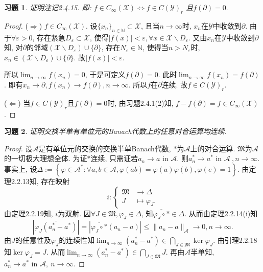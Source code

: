 \documentclass[UTF8,twoside]{ctexbook}
\newtheorem{exercise}{习题}[section]
\newcommand{\h}{\mathscr}
\newcommand{\kx}{\mathbb}
\numberwithin{equation}{section}
\begin{document}
	\begin{exercise}
		证明注记2.4.15. 即: $f\in C_\infty(\h X)\Longleftrightarrow f\in C(\h Y)_r$ 且$f(\partial)=0.$
	\end{exercise}
	\begin{proof}
		($\Rightarrow$) $f\in C_\infty(\h X)$. 设$\{x_n\}_{n\in\kx N}\subset\h X$, 且当$n\rightarrow\infty$时, $x_n$在$\h Y$中收敛到$\partial$. 由于$\forall \varepsilon>0$, 存在紧急$D_\varepsilon\subset\h X$, 使得$|f(x)|<\varepsilon, \forall x\in\h X\backslash D_\varepsilon$. 又由$x_n$在$\h Y$中收敛到$\partial$知, 对$\partial$的邻域$(\h X\backslash D_\varepsilon)\cup\{\partial\}$, 存在$N_\varepsilon\in\kx N$, 使得当$n> N_\varepsilon$时, $x_n\in (\h X\backslash D_\varepsilon)\cup\{\partial\}$. 故$|f(x)|<\varepsilon$.


		所以$\lim_{n\rightarrow\infty}f(x_n)=0$, 于是可定义$f(\partial)=0$. 此时$\lim_{n\rightarrow\infty}f(x_n)=f(\partial)$. 即有$x_n\rightarrow\partial, f(x_n)\rightarrow f(\partial), n\rightarrow\infty$. 所以$f$在$\partial$连续. 故$f\in C(\h Y)_r$.

		($\Leftarrow$) 当$f\in C(\h Y)_r$且$f(\partial)=0$时, 由习题2.4.1(2)知, $f-f(\partial)=f\in C_\infty(\h X)$.
	\end{proof}
	\begin{exercise}
		证明交换半单有单位元的Banach代数上的任意对合运算均连续.
	\end{exercise}
	\begin{proof}
		设$\h A$是有单位元的交换的交换半单Banach代数, $*$为$\h A$上的对合运算. $\mathfrak M$为$\h A$的一切极大理想全体. 为证$*$连续, 只需证若$a_n\rightarrow a \text{ in } \h A$. 则$a_n^*\rightarrow a^* \text{ in } \h A\ ,n\rightarrow \infty$. 事实上, 设$\Delta:=\left\{\varphi\in \h A^*:\forall a,b\in \h A,\varphi(ab)=\varphi(a)\varphi(b),\varphi(e)=1\right\}$. 由定理2.2.13知, 存在映射
		\[
		i:\left\{
		\begin{aligned}
		\mathfrak M&\rightarrow \Delta\\
		J&\mapsto \varphi_J.
		\end{aligned}
		\right.
		\]
		由定理2.2.19知, $i$为双射. 因$\forall J\in \mathfrak M,\varphi_J\in\Delta$, 知$\overline{\varphi_J\circ *}\in \Delta$. 从而由定理2.2.14(i)知
		\[
		|\overline{\varphi_J(a_n^*-a^*)}|=|\overline{\varphi_J\circ *}(a_n-a)|\leq \|a_n-a\|_{\h A}\rightarrow 0,n\rightarrow\infty.
		\]
		由$J$的任意性及$\varphi_J$的连续性知$\lim_{n\rightarrow\infty}(a_n^*-a^*)\in\bigcap_{J\in\mathfrak M}\ker \varphi_J$. 由引理2.2.18知$\ker\varphi_J=J$. 从而$\lim_{n\rightarrow\infty}(a_n^*-a^*)\in\bigcap_{J\in\mathfrak M}J$. 再由$\h A$半单知, $a_n^*\rightarrow a^*\text{ in } \h A,\ n\rightarrow\infty$.
	\end{proof}
\end{document}
